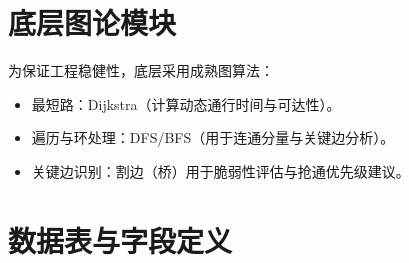 \documentclass[UTF8,zihao=-4,a4paper,fontset=fandol]{ctexrep}
\begin{document}
\section{底层图论模块}
为保证工程稳健性，底层采用成熟图算法：
\begin{itemize}[leftmargin=2em]
  \item 最短路：Dijkstra（计算动态通行时间与可达性）。
  \item 遍历与环处理：DFS/BFS（用于连通分量与关键边分析）。
  \item 关键边识别：割边（桥）用于脆弱性评估与抢通优先级建议。
\end{itemize}

\section{数据表与字段定义}
\end{document}
